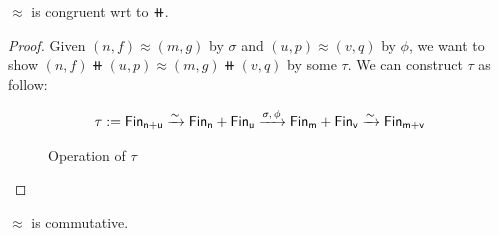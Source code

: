 \begin{proposition}\label{bag:cong}
    $\approx$ is congruent wrt to $\doubleplus$.
\end{proposition}

\begin{proof}
    Given $(n, f) \approx (m, g)$ by $\sigma$ and $(u, p) \approx (v, q)$ by $\phi$,
    we want to show $(n, f) \doubleplus (u, p) \approx (m, g) \doubleplus (v, q)$ by some $\tau$.
    We can construct $\tau$ as follow:

    \begin{align*}
        \tau := \Fin[n+u] \xto{\sim} \Fin[n] + \Fin[u] \xto{\sigma,\,\phi} \Fin[m] + \Fin[v] \xto{\sim} \Fin[m+v] \\
    \end{align*}

    \begin{figure}[H]
        \centering
        \caption{Operation of $\tau$}
        \label{fig:enter-label}
    \end{figure}

\end{proof}

\begin{proposition}\label{bag:comm}
    $\approx$ is commutative.
\end{proposition}


